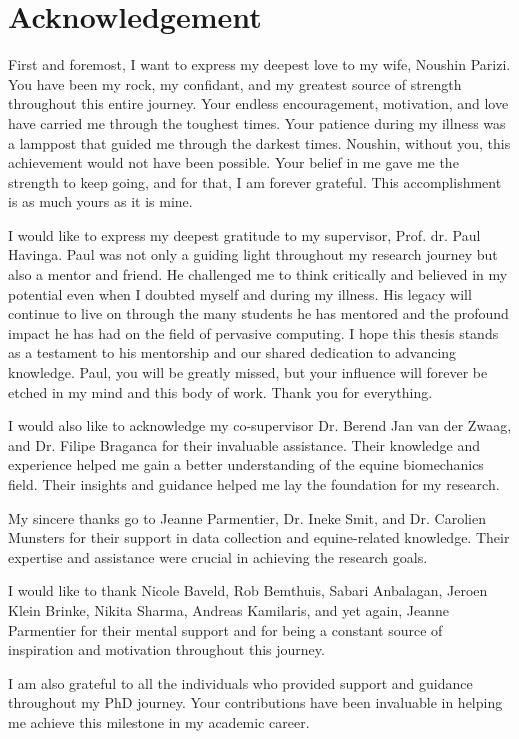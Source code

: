 \chapter*{Acknowledgement}


First and foremost, I want to express my deepest love to my wife, Noushin Parizi. You have been my rock, my confidant, and my greatest source of strength throughout this entire journey. Your endless encouragement, motivation, and love have carried me through the toughest times. Your patience during my illness was a lamppost that guided me through the darkest times. Noushin, without you, this achievement would not have been possible. Your belief in me gave me the strength to keep going, and for that, I am forever grateful. This accomplishment is as much yours as it is mine.

I would like to express my deepest gratitude to my supervisor, Prof. dr. Paul Havinga. Paul was not only a guiding light throughout my research journey but also a mentor and friend. He challenged me to think critically and believed in my potential even when I doubted myself and during my illness. His legacy will continue to live on through the many students he has mentored and the profound impact he has had on the field of pervasive computing. I hope this thesis stands as a testament to his mentorship and our shared dedication to advancing knowledge. Paul, you will be greatly missed, but your influence will forever be etched in my mind and this body of work. Thank you for everything.

I would also like to acknowledge my co-supervisor Dr. Berend Jan van der Zwaag, and Dr. Filipe Braganca for their invaluable assistance. Their knowledge and experience helped me gain a better understanding of the equine biomechanics field. Their insights and guidance helped me lay the foundation for my research.

My sincere thanks go to Jeanne Parmentier, Dr. Ineke Smit, and Dr. Carolien Munsters for their support in data collection and equine-related knowledge. Their expertise and assistance were crucial in achieving the research goals.

I would like to thank Nicole Baveld, Rob Bemthuis, Sabari Anbalagan, Jeroen Klein Brinke, Nikita Sharma, Andreas Kamilaris, and yet again, Jeanne Parmentier for their mental support and for being a constant source of inspiration and motivation throughout this journey.

I am also grateful to all the individuals who provided support and guidance throughout my PhD journey. Your contributions have been invaluable in helping me achieve this milestone in my academic career.